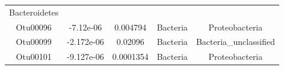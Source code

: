\documentclass[]{article}
\begin{document}
\begin{longtable}[]{@{}ccccc@{}}
\begin{minipage}[t]{0.27\columnwidth}
Bacteroidetes\strut
\end{minipage}\tabularnewline
\begin{minipage}[t]{0.13\columnwidth}\centering\strut
Otu00096\strut
\end{minipage} & \begin{minipage}[t]{0.16\columnwidth}\centering\strut
-7.12e-06\strut
\end{minipage} & \begin{minipage}[t]{0.14\columnwidth}\centering\strut
0.004794\strut
\end{minipage} & \begin{minipage}[t]{0.13\columnwidth}\centering\strut
Bacteria\strut
\end{minipage} & \begin{minipage}[t]{0.27\columnwidth}\centering\strut
Proteobacteria\strut
\end{minipage}\tabularnewline
\begin{minipage}[t]{0.13\columnwidth}\centering\strut
Otu00099\strut
\end{minipage} & \begin{minipage}[t]{0.16\columnwidth}\centering\strut
-2.172e-06\strut
\end{minipage} & \begin{minipage}[t]{0.14\columnwidth}\centering\strut
0.02096\strut
\end{minipage} & \begin{minipage}[t]{0.13\columnwidth}\centering\strut
Bacteria\strut
\end{minipage} & \begin{minipage}[t]{0.27\columnwidth}\centering\strut
Bacteria\_unclassified\strut
\end{minipage}\tabularnewline
\begin{minipage}[t]{0.13\columnwidth}\centering\strut
Otu00101\strut
\end{minipage} & \begin{minipage}[t]{0.16\columnwidth}\centering\strut
-9.127e-06\strut
\end{minipage} & \begin{minipage}[t]{0.14\columnwidth}\centering\strut
0.0001354\strut
\end{minipage} & \begin{minipage}[t]{0.13\columnwidth}\centering\strut
Bacteria\strut
\end{minipage} & \begin{minipage}[t]{0.27\columnwidth}\centering\strut
Proteobacteria\strut
\end{minipage}\tabularnewline

\end{longtable}
\end{document}

